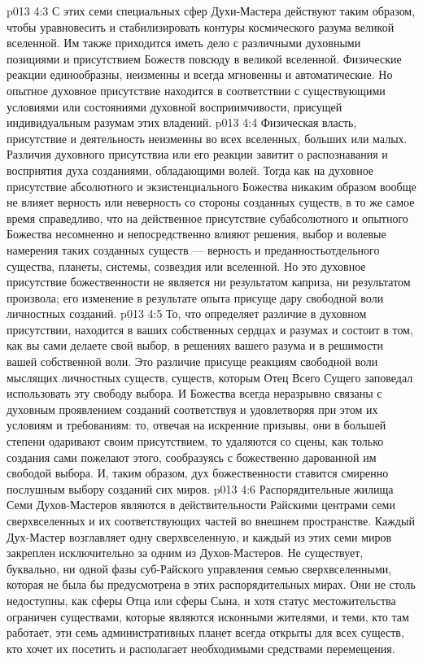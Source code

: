 \vs p013 4:3 С этих семи специальных сфер Духи\hyp{}Мастера действуют таким образом, чтобы уравновесить и стабилизировать контуры космического разума великой вселенной. Им также приходится иметь дело с различными духовными позициями и присутствием Божеств повсюду в великой вселенной. Физические реакции единообразны, неизменны и всегда мгновенны и автоматические. Но опытное духовное присутствие находится в соответствии с существующими условиями или состояниями духовной восприимчивости, присущей индивидуальным разумам этих владений.
\vs p013 4:4 \pc Физическая власть, присутствие и деятельность неизменны во всех вселенных, больших или малых. Различия духовного присутствиа или его реакции завитит о распознавания и восприятия духа созданиями, обладающими волей. Тогда как на духовное присутствие абсолютного и экзистенциального Божества никаким образом вообще не влияет верность или неверность со стороны созданных существ, в то же самое время справедливо, что на действенное присутствие субабсолютного и опытного Божества несомненно и непосредственно влияют решения, выбор и волевые намерения таких созданных существ --- верность и преданностьотдельного существа, планеты, системы, созвездия или вселенной. Но это духовное присутствие божественности не является ни результатом каприза, ни результатом произвола; его изменение в результате опыта присуще дару свободной воли личностных созданий.
\vs p013 4:5 То, что определяет различие в духовном присутствии, находится в ваших собственных сердцах и разумах и состоит в том, как вы сами делаете свой выбор, в решениях вашего разума и в решимости вашей собственной воли. Это различие присуще реакциям свободной воли мыслящих личностных существ, существ, которым Отец Всего Сущего заповедал использовать эту свободу выбора. И Божества всегда неразрывно связаны с духовным проявлением созданий соответствуя и удовлетворяя при этом их условиям и требованиям: то, отвечая на искренние призывы, они в большей степени одаривают своим присутствием, то удаляются со сцены, как только создания сами пожелают этого, сообразуясь с божественно дарованной им свободой выбора. И, таким образом, дух божественности ставится смиренно послушным выбору созданий сих миров.
\vs p013 4:6 \pc Распорядительные жилища Семи Духов\hyp{}Мастеров являются в действительности Райскими центрами семи сверхвселенных и их соответствующих частей во внешнем пространстве. Каждый Дух\hyp{}Мастер возглавляет одну сверхвселенную, и каждый из этих семи миров закреплен исключительно за одним из Духов\hyp{}Мастеров. Не существует, буквально, ни одной фазы суб\hyp{}Райского управления семью сверхвселенными, которая не была бы предусмотрена в этих распорядительных мирах. Они не столь недоступны, как сферы Отца или сферы Сына, и хотя статус местожительства ограничен существами, которые являются исконными жителями, и теми, кто там работает, эти семь административных планет всегда открыты для всех существ, кто хочет их посетить и располагает необходимыми средствами перемещения.
